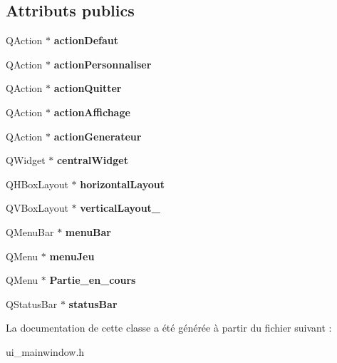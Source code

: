 \subsection*{Attributs publics}
\begin{DoxyCompactItemize}
\item 
\mbox{\label{class_ui___main_window_ae8df6a5fb21c71ed69ea2b5dfd9998ba}} 
Q\+Action $\ast$ {\bfseries action\+Defaut}
\item 
\mbox{\label{class_ui___main_window_acb1429aa096bee6deb15e5ae60b2fc91}} 
Q\+Action $\ast$ {\bfseries action\+Personnaliser}
\item 
\mbox{\label{class_ui___main_window_a3d416f0c4ac4511347e24a06d4f58e85}} 
Q\+Action $\ast$ {\bfseries action\+Quitter}
\item 
\mbox{\label{class_ui___main_window_aafeefc61da0f76715334047389739b71}} 
Q\+Action $\ast$ {\bfseries action\+Affichage}
\item 
\mbox{\label{class_ui___main_window_a3ffe9fadc40c90e078248ca8b8d8e880}} 
Q\+Action $\ast$ {\bfseries action\+Generateur}
\item 
\mbox{\label{class_ui___main_window_a30075506c2116c3ed4ff25e07ae75f81}} 
Q\+Widget $\ast$ {\bfseries central\+Widget}
\item 
\mbox{\label{class_ui___main_window_acd6fdc9ebacc4b25b834162380d75ce8}} 
Q\+H\+Box\+Layout $\ast$ {\bfseries horizontal\+Layout}
\item 
\mbox{\label{class_ui___main_window_a0c01bad60d9f422a1258e710635a2f65}} 
Q\+V\+Box\+Layout $\ast$ {\bfseries vertical\+Layout\+\_}
\item 
\mbox{\label{class_ui___main_window_a2be1c24ec9adfca18e1dcc951931457f}} 
Q\+Menu\+Bar $\ast$ {\bfseries menu\+Bar}
\item 
\mbox{\label{class_ui___main_window_a4fb1917ceb54640476432ba1a1668f1f}} 
Q\+Menu $\ast$ {\bfseries menu\+Jeu}
\item 
\mbox{\label{class_ui___main_window_a20b627d1ab0c5adc4853b8a3d4437d93}} 
Q\+Menu $\ast$ {\bfseries Partie\+\_\+en\+\_\+cours}
\item 
\mbox{\label{class_ui___main_window_a50fa481337604bcc8bf68de18ab16ecd}} 
Q\+Status\+Bar $\ast$ {\bfseries status\+Bar}
\end{DoxyCompactItemize}


La documentation de cette classe a été générée à partir du fichier suivant \+:\begin{DoxyCompactItemize}
\item 
ui\+\_\+mainwindow.\+h\end{DoxyCompactItemize}
